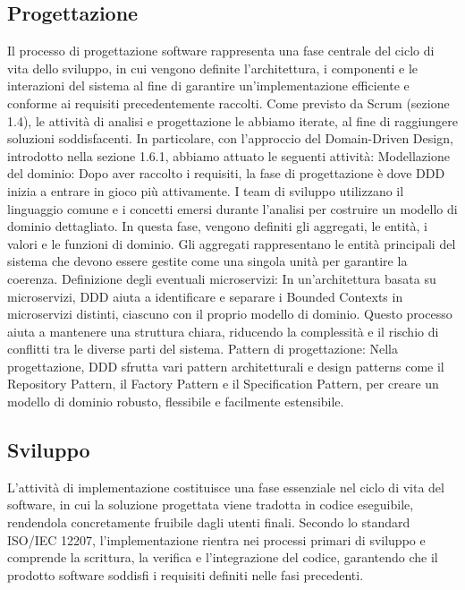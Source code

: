         \subsection{Progettazione}
        Il processo di progettazione software rappresenta una fase centrale del ciclo di vita dello sviluppo, in cui vengono definite l'architettura, i componenti e le interazioni del sistema al fine di garantire un’implementazione efficiente e conforme ai requisiti precedentemente raccolti. 
        Come previsto da Scrum (sezione 1.4), le attività di analisi e progettazione le abbiamo iterate, al fine di raggiungere soluzioni soddisfacenti. 
        In particolare, con l'approccio del Domain-Driven Design, introdotto nella sezione 1.6.1, abbiamo attuato le seguenti attività:
        Modellazione del dominio: Dopo aver raccolto i requisiti, la fase di progettazione è dove DDD inizia a entrare in gioco più attivamente. I team di sviluppo utilizzano il linguaggio comune e i concetti emersi durante l'analisi per costruire un modello di dominio dettagliato. In questa fase, vengono definiti gli aggregati, le entità, i valori e le funzioni di dominio. Gli aggregati rappresentano le entità principali del sistema che devono essere gestite come una singola unità per garantire la coerenza.
        Definizione degli eventuali microservizi: In un’architettura basata su microservizi, DDD aiuta a identificare e separare i Bounded Contexts in microservizi distinti, ciascuno con il proprio modello di dominio. Questo processo aiuta a mantenere una struttura chiara, riducendo la complessità e il rischio di conflitti tra le diverse parti del sistema.
        Pattern di progettazione: Nella progettazione, DDD sfrutta vari pattern architetturali e design patterns come il Repository Pattern, il Factory Pattern e il Specification Pattern, per creare un modello di dominio robusto, flessibile e facilmente estensibile.
        
        \subsection{Sviluppo}
        L'attività di implementazione costituisce una fase essenziale nel ciclo di vita del software, in cui la soluzione progettata viene tradotta in codice eseguibile, rendendola concretamente fruibile dagli utenti finali. Secondo lo standard ISO/IEC 12207, l'implementazione rientra nei processi primari di sviluppo e comprende la scrittura, la verifica e l'integrazione del codice, garantendo che il prodotto software soddisfi i requisiti definiti nelle fasi precedenti.


